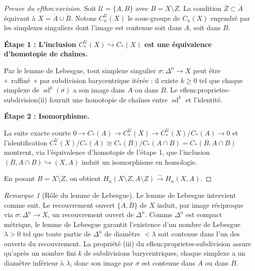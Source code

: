 \documentclass[12pt,a4paper,openany]{book}
\theoremstyle{definition}
\theoremstyle{plain}
\theoremstyle{remark}
\newtheorem{remarque}[definition]{Remarque}
\begin{document}
\begin{proof}[Preuve du 
ef{thm:excision}]
Soit $\mathcal{U} = \{A, B\}$ avec $B = X \setminus Z$. La condition $\overline{Z} \subset \mathring{A}$
équivaut à $X = \mathring{A} \cup \mathring{B}$. Notons $C_n^\mathcal{U}(X)$ le sous-groupe de
$C_n(X)$ engendré par les simplexes singuliers dont l'image est contenue soit dans $A$, soit dans $B$.

\textbf{Étape 1 : L'inclusion $C_*^\mathcal{U}(X) \hookrightarrow C_*(X)$ est une équivalence d'homotopie de chaînes.}

Par le lemme de Lebesgue, tout simplexe singulier $\sigma \colon \Delta^n \to X$
peut être «~raffiné~» par subdivision barycentrique itérée : il existe $k \geq 0$ tel que chaque
simplexe de $\operatorname{sd}^k(\sigma)$ a son image dans $A$ ou dans $B$.
Le 
ef{lem:proprietes-subdivision}(ii) fournit une homotopie de chaînes entre $\operatorname{sd}^k$
et l'identité.

\textbf{Étape 2 : Isomorphisme.}

La suite exacte courte
$0 \to C_*(A) \to C_*^\mathcal{U}(X) \to C_*^\mathcal{U}(X)/C_*(A) \to 0$
et l'identification $C_*^\mathcal{U}(X)/C_*(A) \cong C_*(B)/C_*(A \cap B) = C_*(B, A \cap B)$
montrent, via l'équivalence d'homotopie de l'étape 1, que
l'inclusion $(B, A \cap B) \hookrightarrow (X, A)$ induit un isomorphisme en homologie.

En posant $B = X \setminus Z$, on obtient
$H_n(X \setminus Z, A \setminus Z) \xrightarrow{\sim} H_n(X, A)$.
\end{proof}

\begin{remarque}[Rôle du lemme de Lebesgue]\label{rem:lebesgue-excision}
Le lemme de Lebesgue intervient comme suit. Le recouvrement ouvert
$\{\mathring{A}, \mathring{B}\}$ de $X$ induit, par image réciproque via $\sigma \colon \Delta^n \to X$,
un recouvrement ouvert de $\Delta^n$. Comme $\Delta^n$ est compact métrique, le lemme de Lebesgue
garantit l'existence d'un nombre de Lebesgue $\lambda > 0$ tel que toute partie de $\Delta^n$ de
diamètre $< \lambda$ soit contenue dans l'un des ouverts du recouvrement. La propriété
(iii) du 
ef{lem:proprietes-subdivision} assure qu'après un nombre fini $k$ de subdivisions
barycentriques, chaque simplexe a un diamètre inférieur à $\lambda$, donc son image par $\sigma$
est contenue dans $A$ ou dans $B$.
\end{remarque}

\end{document}
